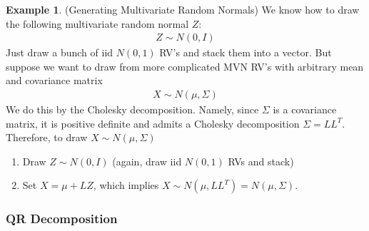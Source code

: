\documentclass[12pt]{article}
\numberwithin{equation}{section} %
\theoremstyle{plain}
\theoremstyle{definition}
\newtheorem{ex}[thm]{Example}
\theoremstyle{remark}
\begin{document}
\begin{ex}(Generating Multivariate Random Normals)
We know how to draw the following multivariate random normal $Z$:
\begin{align*}
  Z \sim N(0,I)
\end{align*}
Just draw a bunch of iid $N(0,1)$ RV's and stack them into a vector.
But suppose we want to draw from more complicated MVN RV's with
arbitrary mean and covariance matrix
\begin{align*}
  X \sim N(\mu, \Sigma)
\end{align*}
We do this by the Cholesky decomposition. Namely, since $\Sigma$ is a
covariance matrix, it is positive definite and admits a Cholesky
decomposition $\Sigma=LL^T$. Therefore, to draw $X\sim N(\mu,\Sigma)$
\begin{enumerate}
  \item Draw $Z\sim N(0,I)$ (again, draw iid $N(0,1)$ RVs and stack)
  \item Set $X=\mu+LZ$, which implies $X\sim N(\mu,LL^T)=N(\mu,\Sigma)$.
\end{enumerate}
\end{ex}

\subsubsection{QR Decomposition}
\end{document}

